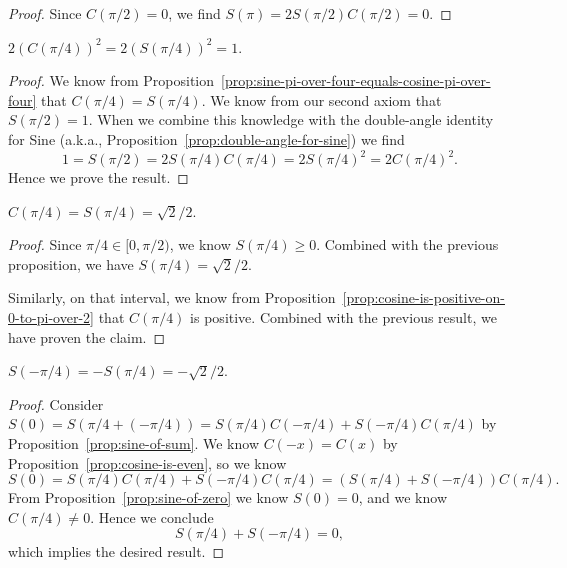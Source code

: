 \begin{proof}
  Since $C(\pi/2)=0$, we find $S(\pi)=2S(\pi/2)C(\pi/2)=0$.
\end{proof}

\begin{proposition}
$2(C(\pi/4))^{2} = 2(S(\pi/4))^{2} = 1$.
\end{proposition}
\begin{proof}
We know from Proposition~\ref{prop:sine-pi-over-four-equals-cosine-pi-over-four}
that $C(\pi/4)=S(\pi/4)$. We know from our second axiom that $S(\pi/2)=1$.
When we combine this knowledge with the double-angle identity for Sine
(a.k.a., Proposition~\ref{prop:double-angle-for-sine}) we find
\begin{equation}
1 = S(\pi/2) = 2S(\pi/4)C(\pi/4) = 2S(\pi/4)^{2} = 2C(\pi/4)^{2}.
\end{equation}
Hence we prove the result.
\end{proof}

\begin{proposition}\label{prop:sine-of-pi-over-four}
$C(\pi/4) = S(\pi/4) = \sqrt{2}/2$.
\end{proposition}

\begin{proof}
Since $\pi/4\in[0,\pi/2)$, we know $S(\pi/4)\geq 0$. Combined with the
  previous proposition, we have $S(\pi/4) = \sqrt{2}/2$.

Similarly, on that interval, we know from Proposition~\ref{prop:cosine-is-positive-on-0-to-pi-over-2}
that $C(\pi/4)$ is positive. Combined with the previous result, we have
proven the claim.
\end{proof}

\begin{proposition}
$S(-\pi/4) = -S(\pi/4) = -\sqrt{2}/2$.
\end{proposition}
\begin{proof}
  Consider $S(0) = S(\pi/4 + (-\pi/4)) = S(\pi/4)C(-\pi/4) + S(-\pi/4)C(\pi/4)$
  by Proposition~\ref{prop:sine-of-sum}.
  We know $C(-x)=C(x)$ by Proposition~\ref{prop:cosine-is-even}, so we
  know
  \begin{equation}
S(0) = S(\pi/4)C(\pi/4) + S(-\pi/4)C(\pi/4) = (S(\pi/4) + S(-\pi/4))C(\pi/4).
  \end{equation}
  From Proposition~\ref{prop:sine-of-zero} we know $S(0)=0$, and we know
  $C(\pi/4)\neq 0$. Hence we conclude
  \begin{equation}
S(\pi/4) + S(-\pi/4) = 0,
  \end{equation}
  which implies the desired result.
\end{proof}

